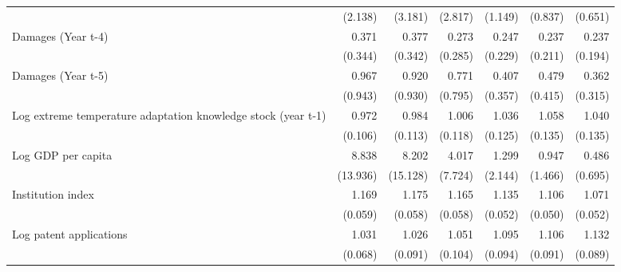 \begin{table}[htbp]
\begin{tabular}{l*{6}{D{.}{.}{-1}}}
                    &     (2.138)         &     (3.181)         &     (2.817)         &     (1.149)         &     (0.837)         &     (0.651)         \\
\addlinespace
Damages (Year t-4)  &       0.371         &       0.377         &       0.273         &       0.247         &       0.237         &       0.237\sym{*}  \\
                    &     (0.344)         &     (0.342)         &     (0.285)         &     (0.229)         &     (0.211)         &     (0.194)         \\
\addlinespace
Damages (Year t-5)  &       0.967         &       0.920         &       0.771         &       0.407         &       0.479         &       0.362         \\
                    &     (0.943)         &     (0.930)         &     (0.795)         &     (0.357)         &     (0.415)         &     (0.315)         \\
\addlinespace
Log extreme temperature adaptation knowledge stock (year t-1)&       0.972         &       0.984         &       1.006         &       1.036         &       1.058         &       1.040         \\
                    &     (0.106)         &     (0.113)         &     (0.118)         &     (0.125)         &     (0.135)         &     (0.135)         \\
\addlinespace
Log GDP per capita  &       8.838         &       8.202         &       4.017         &       1.299         &       0.947         &       0.486         \\
                    &    (13.936)         &    (15.128)         &     (7.724)         &     (2.144)         &     (1.466)         &     (0.695)         \\
\addlinespace
Institution index   &       1.169\sym{***}&       1.175\sym{***}&       1.165\sym{***}&       1.135\sym{***}&       1.106\sym{**} &       1.071         \\
                    &     (0.059)         &     (0.058)         &     (0.058)         &     (0.052)         &     (0.050)         &     (0.052)         \\
\addlinespace
Log patent applications&       1.031         &       1.026         &       1.051         &       1.095         &       1.106         &       1.132         \\
                    &     (0.068)         &     (0.091)         &     (0.104)         &     (0.094)         &     (0.091)         &     (0.089)         \\

\end{tabular}
\end{table}
